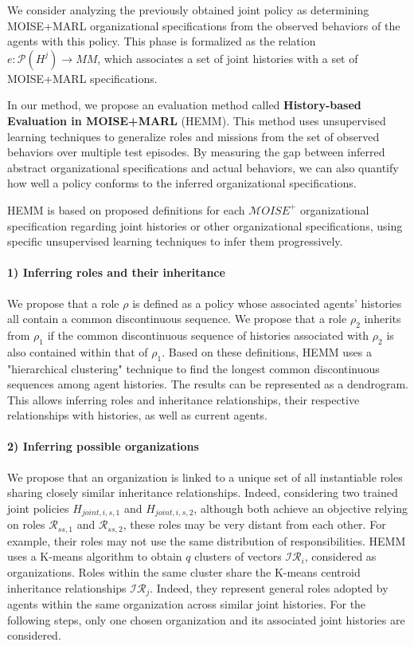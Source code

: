 \documentclass[sigconf,anonymous]{aamas}
\begin{document}
We consider analyzing the previously obtained joint policy as determining MOISE+MARL organizational specifications from the observed behaviors of the agents with this policy. This phase is formalized as the relation $e: \mathcal{P}(H^{j}) \to MM$, which associates a set of joint histories with a set of MOISE+MARL specifications.

In our method, we propose an evaluation method called \textbf{History-based Evaluation in MOISE+MARL} (HEMM). This method uses unsupervised learning techniques to generalize roles and missions from the set of observed behaviors over multiple test episodes. By measuring the gap between inferred abstract organizational specifications and actual behaviors, we can also quantify how well a policy conforms to the inferred organizational specifications.

HEMM is based on proposed definitions for each $\mathcal{M}OISE^+$ organizational specification regarding joint histories or other organizational specifications, using specific unsupervised learning techniques to infer them progressively.

\paragraph{\textbf{1) Inferring roles and their inheritance}}

We propose that a role $\rho$ is defined as a policy whose associated agents' histories all contain a common discontinuous sequence. We propose that a role $\rho_2$ inherits from $\rho_1$ if the common discontinuous sequence of histories associated with $\rho_2$ is also contained within that of $\rho_1$.
Based on these definitions, HEMM uses a "hierarchical clustering" technique to find the longest common discontinuous sequences among agent histories. The results can be represented as a dendrogram. This allows inferring roles and inheritance relationships, their respective relationships with histories, as well as current agents.

\paragraph{\textbf{2) Inferring possible organizations}}

We propose that an organization is linked to a unique set of all instantiable roles sharing closely similar inheritance relationships. Indeed, considering two trained joint policies $H_{joint,i,s,1}$ and $H_{joint,i,s,2}$, although both achieve an objective relying on roles $\mathcal{R}_{ss,1}$ and $\mathcal{R}_{ss,2}$, these roles may be very distant from each other. For example, their roles may not use the same distribution of responsibilities.
HEMM uses a K-means algorithm to obtain $q$ clusters of vectors $\mathcal{IR}_{i}$, considered as organizations. Roles within the same cluster share the K-means centroid inheritance relationships $\mathcal{IR}_j$. Indeed, they represent general roles adopted by agents within the same organization across similar joint histories.
For the following steps, only one chosen organization and its associated joint histories are considered.
\end{document}
